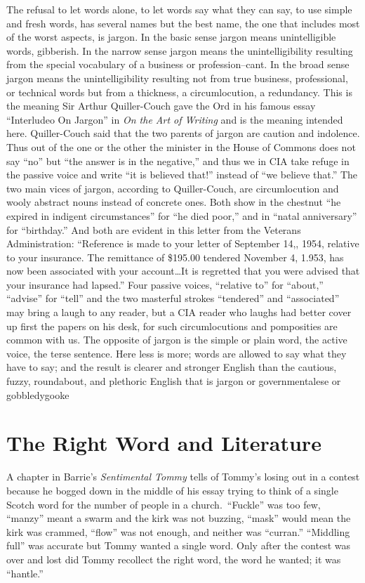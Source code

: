 \documentclass[
    oneside,
    11pt,
    draft
]{memoir}
\begin{document}
The refusal to let words alone, to let words say what they can say, to use simple and fresh words, has several names but the best name, the one that includes most of the worst aspects, is jargon. In the basic sense jargon means unintelligible words, gibberish. In the narrow sense jargon means the unintelligibility resulting from the special vocabulary of a business or profession--cant. In the broad sense jargon means the unintelligibility resulting not from true business, professional, or technical words but from a thickness, a circumlocution, a redundancy. This is the meaning Sir Arthur Quiller-Couch gave the Ord in his famous essay \enquote{Interludeo On Jargon} in \emph{On the Art of Writing} and is the meaning intended here. Quiller-Couch said that the two parents of jargon are caution and indolence. Thus out of the one or the other the minister in the House of Commons does not say \enquote{no} but \enquote{the answer is in the negative,} and thus we in CIA take refuge in the passive voice and write \enquote{it is believed that!} instead of \enquote{we believe that.} The two main vices of jargon, according to Quiller-Couch, are circumlocution and wooly abstract nouns instead of concrete ones. Both show in the chestnut \enquote{he expired in indigent circumstances} for \enquote{he died poor,} and in \enquote{natal anniversary} for \enquote{birthday.} And both are evident in this letter from the Veterans Administration: \enquote{Reference is made to your letter of September 14,, 1954, relative to your insurance. The remittance of \$195.00 tendered November 4, 1.953, has now been associated with your account\dots It is regretted that you were advised that your insurance had lapsed.} Four passive voices, \enquote{relative to} for \enquote{about,} \enquote{advise} for \enquote{tell} and the two masterful strokes \enquote{tendered} and \enquote{associated} may bring a laugh to any reader, but a CIA reader who laughs had better cover up first the papers on his desk, for such circumlocutions and pomposities are common with us. The opposite of jargon is the simple or plain word, the active voice, the terse sentence. Here less is more; words are allowed to say what they have to say; and the result is clearer and stronger English than the cautious, fuzzy, roundabout, and plethoric English that is jargon or governmentalese or gobbledygooke

\chapter{The Right Word and Literature}
A chapter in Barrie's \emph{Sentimental Tommy} tells of Tommy's losing out in a contest because he bogged down in the middle of his essay trying to think of a single Scotch word for the number of people in a church.\ \enquote{Fuckle} was too few, \enquote{manzy} meant a swarm and the kirk was not buzzing, \enquote{mask} would mean the kirk was crammed, \enquote{flow} was not enough, and neither was \enquote{curran.} \enquote{Middling full} was accurate but Tommy wanted a single word. Only after the contest was over and lost did Tommy recollect the right word, the word he wanted; it was \enquote{hantle.}
\end{document}
